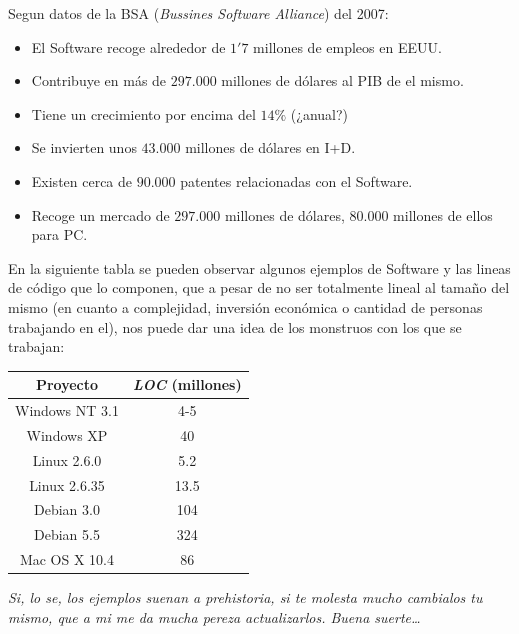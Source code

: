 Segun datos de la BSA (\textit{Bussines Software Alliance}) del 2007:
\begin{itemize}
    \item El Software recoge alrededor de $1'7$ millones de empleos en EEUU.
    \item Contribuye en más de $297.000$ millones de dólares al PIB de el mismo.
    \item Tiene un crecimiento por encima del $14\%$ (¿anual?)
    \item Se invierten unos $43.000$ millones de dólares en I+D.
    \item Existen cerca de $90.000$ patentes relacionadas con el Software.
    \item Recoge un mercado de $297.000$ millones de dólares, $80.000$ millones de ellos para PC.
\end{itemize}

En la siguiente tabla se pueden observar algunos ejemplos de Software y las lineas de código que lo componen,
que a pesar de no ser totalmente lineal al tamaño del mismo (en cuanto a complejidad, inversión económica o cantidad
de personas trabajando en el), nos puede dar una idea de los monstruos con los que se trabajan:
\begin{table}[h]
    \centering
    \begin{tabular}{cc}
        \hline
        Proyecto        & \textit{LOC} (millones)   \\
        \hline
        Windows NT 3.1  & 4-5                       \\
        Windows XP      & 40                        \\
        \hline
        Linux 2.6.0     & 5.2                       \\
        Linux 2.6.35    & 13.5                      \\
        \hline
        Debian 3.0      & 104                       \\
        Debian 5.5      & 324                       \\
        \hline
        Mac OS X 10.4   & 86                        \\
        \hline
    \end{tabular}
\end{table}

\small\textit{Si, lo se, los ejemplos suenan a prehistoria, si te molesta mucho cambialos tu mismo, que a mi me da
mucha pereza actualizarlos. Buena suerte\dots}

\vspace*{2mm}


